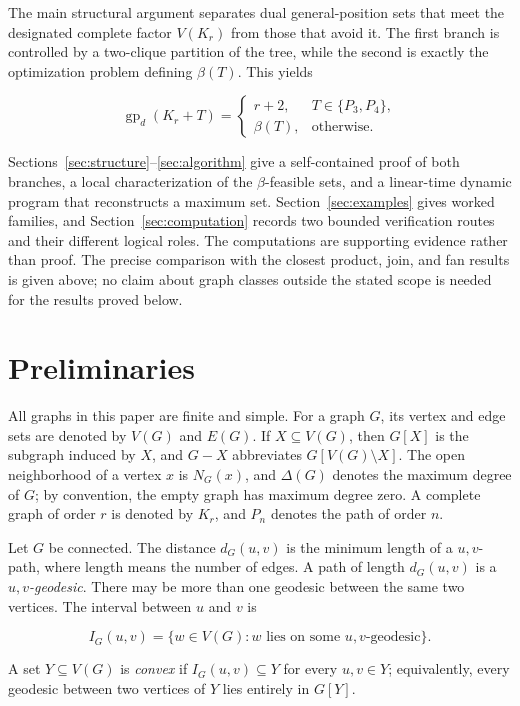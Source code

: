 \documentclass[11pt,a4paper]{article}
\numberwithin{equation}{section}
\begin{document}
The main structural argument separates dual general-position sets that
meet the designated complete factor \(V(K_r)\) from those that avoid it. The first
branch is controlled by a two-clique partition of the tree, while the
second is exactly the optimization problem defining \(\beta(T)\). This
yields

\[
\operatorname{gp}_d(K_r+T)=
\begin{cases}
r+2, & T\in\{P_3,P_4\},\\
\beta(T), & \text{otherwise}.
\end{cases}
\]

Sections~\ref{sec:structure}--\ref{sec:algorithm} give a self-contained proof of both branches, a local
characterization of the \(\beta\)-feasible sets, and a linear-time
dynamic program that reconstructs a maximum set. Section~\ref{sec:examples} gives worked
families, and Section~\ref{sec:computation} records two bounded verification
routes and their different logical roles. The computations are supporting
evidence rather than proof. The precise comparison with the closest product,
join, and fan results is given above; no claim about graph classes outside the
stated scope is needed for the results proved below.

\section{Preliminaries}\label{sec:preliminaries}

All graphs in this paper are finite and simple. For a graph \(G\), its
vertex and edge sets are denoted by \(V(G)\) and \(E(G)\). If
\(X\subseteq V(G)\), then \(G[X]\) is the subgraph induced by \(X\), and
\(G-X\) abbreviates \(G[V(G)\setminus X]\). The open neighborhood of a
vertex \(x\) is \(N_G(x)\), and \(\Delta(G)\) denotes the maximum degree
of \(G\); by convention, the empty graph has maximum degree zero. A
complete graph of order \(r\) is denoted by \(K_r\), and
\(P_n\) denotes the path of order \(n\).

Let \(G\) be connected. The distance \(d_G(u,v)\) is the minimum length
of a \(u,v\)-path, where length means the number of edges. A path of
length \(d_G(u,v)\) is a \emph{\(u,v\)-geodesic}. There may be more than
one geodesic between the same two vertices. The interval between \(u\)
and \(v\) is

\[
I_G(u,v)=\{w\in V(G):w\text{ lies on some }u,v\text{-geodesic}\}.
\]

A set \(Y\subseteq V(G)\) is \emph{convex} if \(I_G(u,v)\subseteq Y\)
for every \(u,v\in Y\); equivalently, every geodesic between two
vertices of \(Y\) lies entirely in \(G[Y]\).
\end{document}
